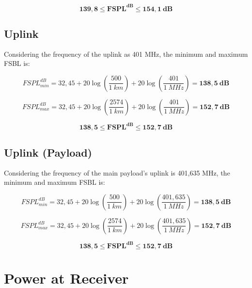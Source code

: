 \begin{equation}
    \mathbf{139,8 \leq FSPL^{dB} \leq 154,1\ dB}
\end{equation}

\subsection{Uplink}

Considering the frequency of the uplink as 401 MHz, the minimum and maximum FSBL is:

\begin{equation}
    FSPL^{dB}_{min} = 32,45 + 20\log\left(\frac{500}{1\ km}\right) + 20\log\left(\frac{401}{1\ MHz}\right) = \mathbf{138,5\ dB}
\end{equation}

\begin{equation}
    FSPL^{dB}_{max} = 32,45 + 20\log\left(\frac{2574}{1\ km}\right) + 20\log\left(\frac{401}{1\ MHz}\right) = \mathbf{152,7\ dB}
\end{equation}

\begin{equation}
    \mathbf{138,5 \leq FSPL^{dB} \leq 152,7\ dB}
\end{equation}

\subsection{Uplink (Payload)}

Considering the frequency of the main payload's uplink is 401,635 MHz, the minimum and maximum FSBL is:

\begin{equation}
    FSPL^{dB}_{min} = 32,45 + 20\log\left(\frac{500}{1\ km}\right) + 20\log\left(\frac{401,635}{1\ MHz}\right) = \mathbf{138,5\ dB}
\end{equation}

\begin{equation}
    FSPL^{dB}_{max} = 32,45 + 20\log\left(\frac{2574}{1\ km}\right) + 20\log\left(\frac{401,635}{1\ MHz}\right) = \mathbf{152,7\ dB}
\end{equation}

\begin{equation}
    \mathbf{138,5 \leq FSPL^{dB} \leq 152,7\ dB}
\end{equation}

\section{Power at Receiver}


